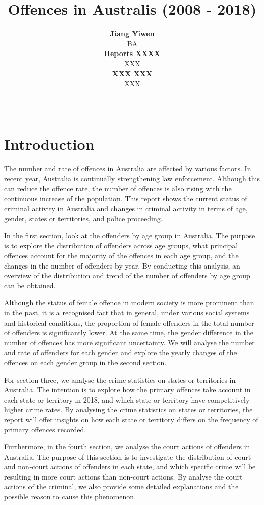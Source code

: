 \documentclass[11pt,a4paper,]{article}
\title{Offences in Australis (2008 - 2018)}
\author{\sf\Large\textbf{ Jiang Yiwen}\\ {\sf\large BA\\[0.5cm]} \sf\Large\textbf{ Reports XXXX}\\ {\sf\large XXX\\[0.5cm]} \sf\Large\textbf{ XXX XXX}\\ {\sf\large XXX\\[0.5cm]}}
\date{\sf\Date~\Month~\Year}
\makeatletter
\def\titlepage{\front{\expandafter{\@title}}{\@author}{\@organization}}
\makeatother
\begin{document}
\titlepage

\hypertarget{introduction}{%
\section{Introduction}\label{introduction}}

The number and rate of offences in Australia are affected by various factors. In recent year, Australia is continually strengthening law enforcement. Although this can reduce the offence rate, the number of offences is also rising with the continuous increase of the population. This report shows the current status of criminal activity in Australia and changes in criminal activity in terms of age, gender, states or territories, and police proceeding.

In the first section, look at the offenders by age group in Australia. The purpose is to explore the distribution of offenders across age groups, what principal offences account for the majority of the offences in each age group, and the changes in the number of offenders by year. By conducting this analysis, an overview of the distribution and trend of the number of offenders by age group can be obtained.

Although the status of female offence in modern society is more prominent than in the past, it is a recognised fact that in general, under various social systems and historical conditions, the proportion of female offenders in the total number of offenders is significantly lower. At the same time, the gender difference in the number of offences has more significant uncertainty. We will analyse the number and rate of offenders for each gender and explore the yearly changes of the offences on each gender group in the second section.

For section three, we analyse the crime statistics on states or territories in Australia. The intention is to explore how the primary offences take account in each state or territory in 2018, and which state or territory have competitively higher crime rates. By analysing the crime statistics on states or territories, the report will offer insights on how each state or territory differs on the frequency of primary offences recorded.

Furthermore, in the fourth section, we analyse the court actions of offenders in Australia. The purpose of this section is to investigate the distribution of court and non-court actions of offenders in each state, and which specific crime will be resulting in more court actions than non-court actions. By analyse the court actions of the criminal, we also provide some detailed explanations and the possible reason to cause this phenomenon.
\end{document}
